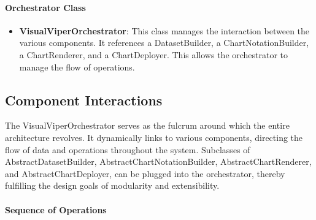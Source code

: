 \paragraph{Orchestrator Class}\label{orchestrator-class}

\begin{itemize}
\item
  \textbf{VisualViperOrchestrator}: This class manages the interaction
  between the various components. It references a DatasetBuilder, a
  ChartNotationBuilder, a ChartRenderer, and a ChartDeployer. This
  allows the orchestrator to manage the flow of operations.
\end{itemize}

\subsection{Component Interactions}\label{component-interactions}

The VisualViperOrchestrator serves as the fulcrum around which the
entire architecture revolves. It dynamically links to various
components, directing the flow of data and operations throughout the
system. Subclasses of AbstractDatasetBuilder,
AbstractChartNotationBuilder, AbstractChartRenderer, and
AbstractChartDeployer, can be plugged into the orchestrator, thereby
fulfilling the design goals of modularity and extensibility.


\paragraph{Sequence of Operations}\label{sequence-of-operations}

